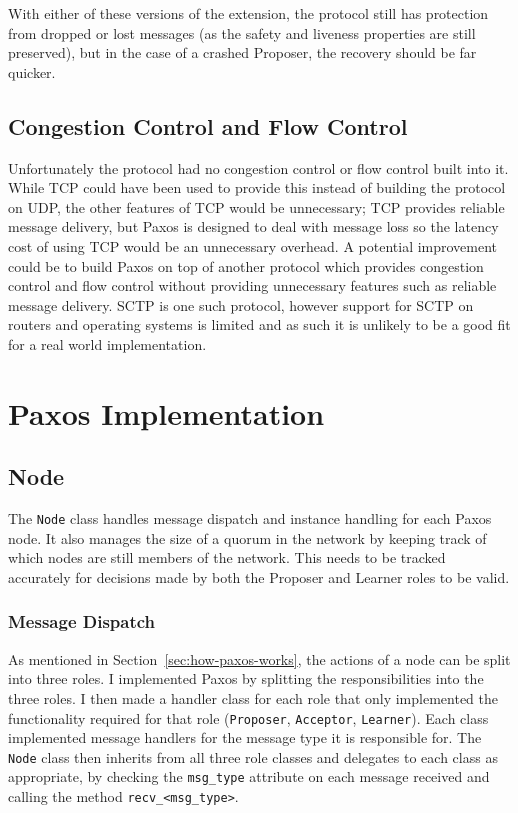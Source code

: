 \documentclass[12pt,twoside,notitlepage]{report}
\begin{document}
With either of these versions of the extension, the protocol still has protection from dropped or
lost messages (as the safety and liveness properties are still preserved), but in the case of a
crashed Proposer, the recovery should be far quicker.

\subsection{Congestion Control and Flow Control}

Unfortunately the protocol had no congestion control or flow control built into it.
While TCP could have been used to provide this instead of building the protocol on UDP, the other
features of TCP would be unnecessary; TCP provides reliable message delivery, but Paxos is
designed to deal with message loss so the latency cost of using TCP would be an unnecessary
overhead.  A potential improvement could be to build Paxos on top of another protocol which
provides congestion control and flow control without providing unnecessary features such as
reliable message delivery. SCTP is one such protocol, however support for SCTP on routers and
operating systems is limited and as such it is unlikely to be a good fit for a real world
implementation.

\section{Paxos Implementation}

\subsection{Node}

The \verb+Node+ class handles message dispatch and instance handling for each Paxos node. It also
manages the size of a quorum in the network by keeping track of which nodes are still members of
the network. This needs to be tracked accurately for decisions made by both the Proposer and
Learner roles to be valid.

\subsubsection{Message Dispatch}

As mentioned in Section~\ref{sec:how-paxos-works}, the actions of a node can be split into three
roles. I implemented Paxos by splitting the responsibilities into the three roles. I then made a
handler class for each role that only implemented the functionality required for that role
(\verb+Proposer+, \verb+Acceptor+, \verb+Learner+). Each class implemented message handlers for
the message type it is responsible for. The \verb+Node+ class then inherits from all three role
classes and delegates to each class as appropriate, by checking the \verb+msg_type+ attribute on
each message received and calling the method \verb+recv_<msg_type>+.
\end{document}
